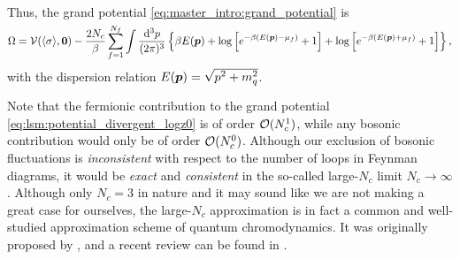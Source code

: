 Thus, the grand potential \eqref{eq:master_intro:grand_potential} is
\begin{equation}
\begin{split}
	\Omega = \pot(\avg{\sigma},\vec{0}) - \frac{2 N_c}{\beta} \sum_{f=1}^{\smash{N_f}} \int \frac{\dif^3 p}{(2 \pi)^3} \left\{ \beta E(\vec{p}) + \log \left[ e^{-\beta (E(\vec{p}) - \mu_f)}+1 \right] + \log \left[ e^{-\beta (E(\vec{p}) + \mu_f)} + 1\right] \right\} ,
\end{split}
\label{eq:lsm:potential_divergent_logz0}
\end{equation}
with the dispersion relation $E(\vec{p}) = \sqrt{\smash[b]{p^2 + m_q^2}}$.

Note that the fermionic contribution to the grand potential \eqref{eq:lsm:potential_divergent_logz0} is of order $\bigo(N_c^1)$,
while any bosonic contribution would only be of order $\bigo(N_c^0)$.
Although our exclusion of bosonic fluctuations is \emph{inconsistent} with respect to the number of loops in Feynman diagrams,
it would be \emph{exact} and \emph{consistent} in the so-called large-$N_c$ limit $N_c \rightarrow \infty$.
Although only $N_c = 3$ in nature and it may sound like we are not making a great case for ourselves,
the large-$N_c$ approximation is in fact a common and well-studied approximation scheme of quantum chromodynamics.
It was originally proposed by \cite{ref:large_Nc_proposition}, and a recent review can be found in \cite{ref:large_Nc_review}.

